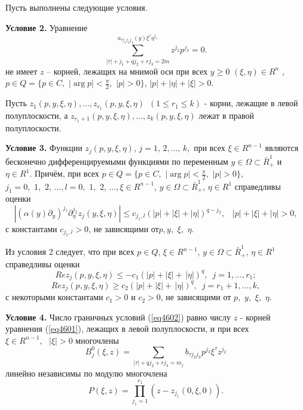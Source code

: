 Пусть выполнены следующие условия.

\textbf{Условие 2.} Уравнение
\[
\sum\limits_{\left| \tau \right| + j_1 + qj_2 + rj_3 = 2m}^ {a_{\tau j_1 j_2
j_3 } (y)\xi ^\tau \eta ^{j_1 }} z^{j_2 }p^{j_3 } = 0.
\]
не имеет $z$ -- корней, лежащих на мнимой оси при всех $y \ge 0\,\,(\xi
,\eta ) \in R^n\,\,$, $p \in Q = \{p \in C,\,\,\left| {\arg p} \right| <
\frac{\pi }{2},\,\,\left| p \right| > 0\}$, $\left| p \right| + \left| \eta
\right| + \left| \xi \right| > 0$.

Пусть $z_1 (p,y,\xi ,\eta ),...,z_{r_1 } (p,y,\xi ,\eta )\,\,\,(1 \le r_1
\le k)$ - корни, лежащие в левой полуплоскости, а $z_{r_1 + 1} (p,y,\xi
,\eta ),...,z_k (p,y,\xi ,\eta )$ лежат в правой полуплоскости.

\textbf{Условие 3.} Функции $z_j (p,y,\xi ,\eta )$, $j = 1,\,2,...,\,k,$ при
всех $\xi \in R^{n - 1}$ являются бесконечно дифференцируемыми функциями по
переменным $y \in \Omega \subset \bar {R}_ + ^1 $ и $\eta \in R^1$. Причём,
при всех $p \in Q = \{p \in C,\,\,\left| {\arg p} \right| < \frac{\pi
}{2},\,\,\left| p \right| > 0\}$, $j_1 = 0,\,\,1,\,\,2,\,...,l =
0,\,\,1,\,\,2,\,...,\xi \in R^{n - 1}$, $y \in \Omega \subset \bar {R}_ +
^1 $, $\eta \in R^1$ справедливы оценки
\[
\left| {(\alpha (y)\partial _y )^{j_1 }\partial _\eta ^{j_2 } z_j (y,\xi
,\eta )} \right| \le c_{j_1 ,l} (\left| p \right| + \left| \xi \right| +
\left| \eta \right|)^{q - j_2 },\,\,\,\,\,\left| p \right| + \left| \xi
\right| + \left| \eta \right| > 0,
\]
с константами $c_{j_1 ,l} > 0$, не зависящими от$p,y,\,\,\xi ,\,\,\eta .$

Из условия 2 следует, что при всех $p \in Q$, $\xi \in R^{n - 1}$, $y \in
\Omega \subset \bar {R}_ + ^1 $, $\eta \in R^1$ справедливы оценки
\[
Rez_j (p,y,\xi ,\eta ) \le - c_1 (\left| p \right| + \left| \xi \right| +
\,\left| \eta \right|)^q,\,\,\,j = 1,...,r_1 ;
\]
\[
Rez_j (p,y,\xi ,\eta ) \ge c_2 (\left| p \right| + \left| \xi \right| +
\,\left| \eta \right|)^q,\,\,\,j = r_1 + 1,...,k,
\]
с некоторыми константами $c_1 >0$
и $c_2 > 0$, не зависящими
от $p,\,\,y,\,\,\xi ,\,\,\eta $.

\textbf{Условие 4.} Число граничных условий (\ref{eq4602}) равно числу $z$ - корней
уравнения (\ref{eq4601}), лежащих в левой полуплоскости, и при всех $\xi \in R^{n -
1},\,\,\,\,\left| \xi \right| > 0$ многочлены
$$
	B_j^0 (\xi ,z) =
	\sum\limits_{\left| \tau \right| + qj_2 + rj_3 = m_j } {b_{\tau j_2 j_3 }
	p^{j_3 }} \xi ^\tau z^{j_2 }
$$
линейно независимы по модулю многочлена
$$
P(\xi ,z) = \prod\limits_{j_1 = 1}^{r_1 } {(z - z_{j_1 } (0,\xi ,0))} .
$$

